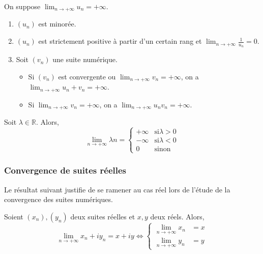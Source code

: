   \begin{proposition}
    On suppose $\lim_{n \rightarrow +\infty} u_n = +\infty$.
    \begin{enumerate}[label=(\roman*)]
      \item $(u_n)$ est minorée.
      \item $(u_n)$ est strictement positive à partir d'un certain rang et $\lim_{n \rightarrow +\infty} \frac{1}{u_n} = 0$.
      \item Soit $(v_n)$ une suite numérique.
      \begin{itemize}
        \item Si $(v_n)$ est convergente ou $\lim_{n \rightarrow +\infty} v_n = +\infty$, on a $\lim_{n \rightarrow +\infty} u_n + v_n = +\infty$.
        \item Si $\lim_{n \rightarrow +\infty} v_n = +\infty$, on a $\lim_{n \rightarrow +\infty} u_n v_n = +\infty$.
      \end{itemize}
    \end{enumerate}
  \end{proposition}


  \begin{example}
    Soit $\lambda \in \mathbb{R}$. Alors,
    \[
    \lim_{n \rightarrow +\infty} \lambda n =
    \begin{cases}
      +\infty &\text{si} \lambda > 0 \\
      -\infty &\text{si} \lambda < 0 \\
      0 &\text{sinon}
    \end{cases}
    \]
  \end{example}

  \subsubsection{Convergence de suites réelles}


  Le résultat suivant justifie de se ramener au cas réel lors de l'étude de la convergence des suites numériques.

  \begin{proposition}
    Soient $(x_n), (y_n)$ deux suites réelles et $x, y$ deux réels. Alors,
    \[
    \lim_{n \rightarrow +\infty} x_n + iy_n = x+iy \iff
    \begin{cases}
      \lim_{n \rightarrow +\infty} x_n &= x \\
      \lim_{n \rightarrow +\infty} y_n &= y
    \end{cases}
    \]
  \end{proposition}

